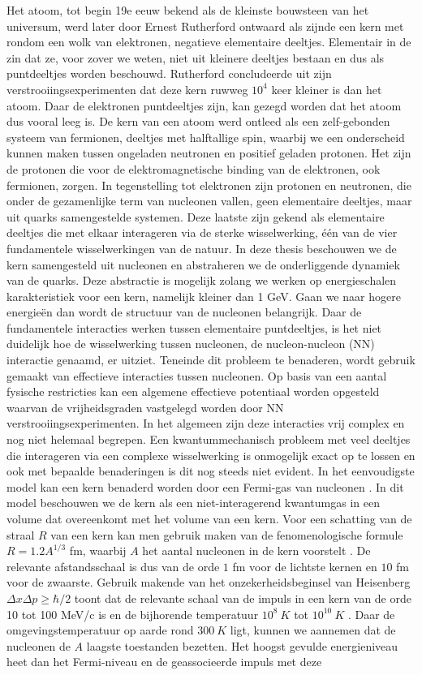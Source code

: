 \documentclass[11pt,twoside]{book}
\begin{document}
Het atoom,  tot begin 19e eeuw bekend als de kleinste bouwsteen van het universum, werd later door Ernest Rutherford \cite{rutherford} ontwaard als zijnde een kern met rondom een wolk van elektronen, negatieve elementaire deeltjes. Elementair in de zin dat ze, voor zover we weten, niet uit kleinere deeltjes bestaan en dus als puntdeeltjes worden beschouwd. Rutherford concludeerde uit zijn verstrooiingsexperimenten dat deze kern ruwweg $10^4$ keer kleiner is dan het atoom. Daar de elektronen puntdeeltjes zijn, kan gezegd worden dat het atoom dus vooral leeg is. De kern van een atoom werd ontleed als een zelf-gebonden systeem van fermionen, deeltjes met halftallige spin, waarbij we een onderscheid kunnen maken tussen ongeladen neutronen en positief geladen protonen. Het zijn de protonen die voor de elektromagnetische binding van de elektronen, ook fermionen, zorgen. In tegenstelling tot elektronen zijn protonen en neutronen, die onder de gezamenlijke term van nucleonen vallen,  geen elementaire deeltjes, maar uit quarks samengestelde systemen. Deze laatste zijn gekend als elementaire deeltjes die met elkaar interageren via de sterke wisselwerking, \'{e}\'{e}n van de vier fundamentele wisselwerkingen van de natuur. In deze thesis beschouwen we de kern samengesteld uit nucleonen en abstraheren we de onderliggende dynamiek van de quarks. Deze abstractie is mogelijk zolang we werken op energieschalen karakteristiek voor een kern, namelijk kleiner dan 1 GeV. Gaan we naar hogere energie\"{e}n dan wordt de structuur van de nucleonen belangrijk. Daar de fundamentele interacties werken tussen elementaire puntdeeltjes, is het niet duidelijk hoe de wisselwerking tussen nucleonen,  de nucleon-nucleon (NN) interactie genaamd, er uitziet. Teneinde dit probleem te benaderen, wordt gebruik gemaakt van effectieve interacties tussen nucleonen. Op basis van een aantal fysische restricties kan een algemene effectieve potentiaal worden opgesteld waarvan de vrijheidsgraden vastgelegd worden door NN verstrooiingsexperimenten. In het algemeen zijn deze interacties vrij complex en nog niet helemaal begrepen. Een kwantummechanisch probleem met veel deeltjes die interageren via een complexe wisselwerking is onmogelijk exact op te lossen en ook met bepaalde benaderingen is dit nog steeds niet evident. In het eenvoudigste model kan een kern benaderd worden door een Fermi-gas van nucleonen  \cite{povh2008particles}. In dit model beschouwen we de kern als een niet-interagerend kwantumgas in een volume dat overeenkomt met het volume van een kern. Voor een schatting van de straal $R$ van een kern kan men gebruik maken van de fenomenologische formule $R=1.2 A^{1/3}$ fm, waarbij $A$ het aantal nucleonen in de kern voorstelt \cite{povh2008particles}. De relevante afstandsschaal is dus van de orde $1$ fm voor de lichtste kernen en $10$ fm voor de zwaarste. Gebruik makende van het onzekerheidsbeginsel van Heisenberg $\Delta x \Delta p \geq \hbar/2$ toont dat de relevante schaal van de impuls in een kern van de orde 10 tot 100 MeV/c is en de bijhorende temperatuur $10^8\ K$ tot $10^{10}\ K$ . Daar de omgevingstemperatuur op aarde rond $300\ K$ ligt, kunnen we aannemen dat de nucleonen de $A$ laagste toestanden bezetten. Het hoogst gevulde energieniveau heet dan het Fermi-niveau en de geassocieerde impuls met deze 
\end{document}
